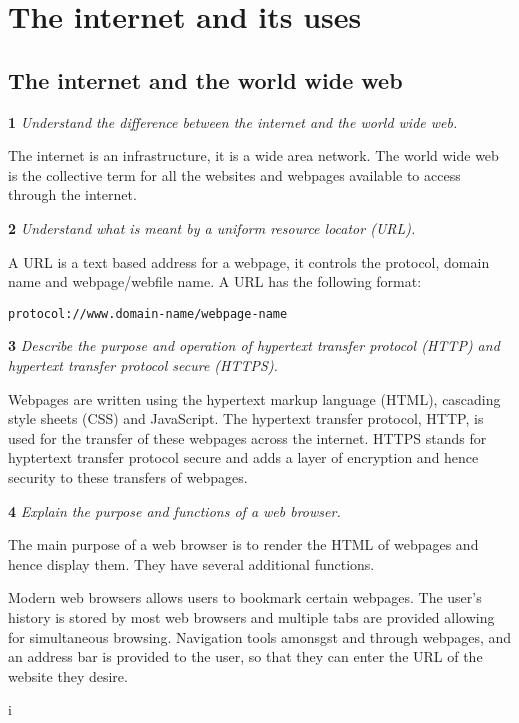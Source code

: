 \section{The internet and its uses}
\subsection{The internet and the world wide web}

\noindent\textbf{1} \textit{Understand the difference between the internet and the world wide web.}

The internet is an infrastructure, it is a wide area network. The world wide web is the collective
term for all the websites and webpages available to access through the internet.

\bigskip

\noindent\textbf{2} \textit{Understand what is meant by a uniform resource locator (URL).}

A URL is a text based address for a webpage, it controls the protocol, domain name and 
webpage/webfile name. A URL has the following format:

\begin{center}
\begin{BVerbatim}
protocol://www.domain-name/webpage-name
\end{BVerbatim}
\end{center}

\bigskip

\noindent\textbf{3} \textit{Describe the purpose and operation of hypertext
transfer protocol (HTTP) and hypertext transfer
protocol secure (HTTPS).}

Webpages are written using the hypertext markup language (HTML), cascading style sheets (CSS) and
JavaScript. The hypertext transfer protocol, HTTP, is used for the transfer of these webpages
across the internet. HTTPS stands for hyptertext transfer protocol secure and adds a layer of
encryption and hence security to these transfers of webpages.

\bigskip

\noindent\textbf{4} \textit{Explain the purpose and functions of a web browser.}

The main purpose of a web browser is to render the HTML of webpages and hence display them. They
have several additional functions.

Modern web browsers allows users to bookmark certain webpages. The user's history is stored by
most web browsers and multiple tabs are provided allowing for simultaneous browsing. Navigation
tools amonsgst and through webpages, and an address bar is provided to the user, so that they can
enter the URL of the website they desire.

\newpage i

